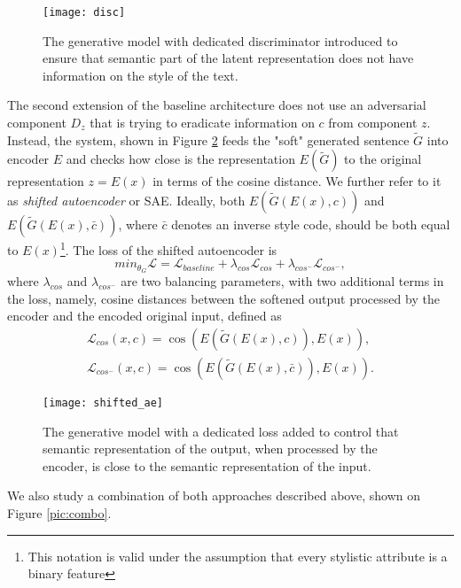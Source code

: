 \documentclass[11pt,a4paper]{article}
\begin{document}
\begin{figure}[ht]
\begin{center}
\centerline{\texttt{[image: disc]}}
\caption{The generative model with dedicated discriminator introduced to ensure that semantic part of the latent representation does not have information on the style of the text.}
\label{pic:d}
\end{center}
\end{figure}

The second extension of the baseline architecture does not use an adversarial component $D_z$ that is trying to eradicate information on $c$ from component $z$. Instead, the system, shown in Figure \ref{pic:sae} feeds the "soft" generated sentence $\tilde{G}$ into encoder $E$ and checks how close is the representation $E(\tilde{G} )$ to the original representation $z = E(x)$ in terms of the cosine distance. We further refer to it as {\em shifted autoencoder} or SAE. Ideally, both $E(\tilde{G} (E(x), c))$ and $E(\tilde{G} (E(x), \bar{c}))$, where $\bar{c}$ denotes an inverse style code, should be both equal to $E(x)$\footnote{This notation is valid under the assumption that every stylistic attribute is a binary feature}. The loss of the shifted autoencoder is 
\begin{equation}
\label{eq:gesae}
min_{\theta_G} \mathcal{L} = \mathcal{L}_{baseline} +  \lambda_{cos} \mathcal{L}_{cos} +  \lambda_{cos^{-}} \mathcal{L}_{cos^{-}},
\end{equation}
where $\lambda_{cos}$ and $\lambda_{cos^{-}}$ are two balancing parameters, with two additional terms in the loss, namely, cosine distances between the softened output processed by the encoder and the encoded original input, defined as 
\begin{eqnarray}
\label{eq:cosloss}
\mathcal{L}_{cos} (x,c) = \cos \left( E(\tilde{G}(E(x), c)), E(x) \right),  \nonumber \\
\mathcal{L}_{cos^{-}} (x,c) = \cos \left( E(\tilde{G}(E(x), \bar{c})), E(x) \right).
\end{eqnarray}

\begin{figure}[ht]
\begin{center}
\centerline{\texttt{[image: shifted\_ae]}}
\caption{The generative model with a dedicated loss added to control that semantic representation of the output, when processed by the encoder, is close to the semantic representation of the input.}
\label{pic:sae}
\end{center}
\end{figure}
We also study a combination of both approaches described above, shown on Figure \ref{pic:combo}.
\end{document}
